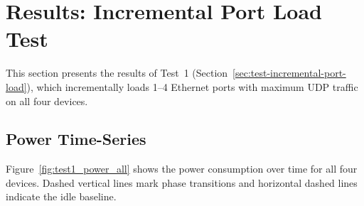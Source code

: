 \section{Results: Incremental Port Load Test}
\label{sec:results}

This section presents the results of Test~1 (Section~\ref{sec:test-incremental-port-load}), which incrementally loads 1--4 Ethernet ports with maximum \ac{UDP} traffic on all four devices.

\subsection{Power Time-Series}
\label{sec:per-device-results}

Figure~\ref{fig:test1_power_all} shows the power consumption over time for all four devices.
Dashed vertical lines mark phase transitions and horizontal dashed lines indicate the idle baseline.

